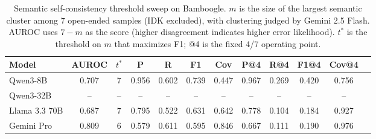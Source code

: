 \begin{table}[t]
\centering
\scriptsize
\setlength\tabcolsep{3pt}
\caption{Semantic self-consistency threshold sweep on Bamboogle. $m$ is the size of the largest semantic cluster among 7 open-ended samples (IDK excluded), with clustering judged by Gemini 2.5 Flash. AUROC uses $7-m$ as the score (higher disagreement indicates higher error likelihood). $t^*$ is the threshold on $m$ that maximizes F1; @4 is the fixed 4/7 operating point.}
\label{tab:bamboogle_self_consistency_semantic_sweep}
\begin{tabular}{lccccccccccc}
\toprule
\textbf{Model} & \textbf{AUROC} & \textbf{$t^*$} & \textbf{P} & \textbf{R} & \textbf{F1} & \textbf{Cov} & \textbf{P@4} & \textbf{R@4} & \textbf{F1@4} & \textbf{Cov@4} \\
\midrule
Qwen3-8B & 0.707 & 7 & 0.956 & 0.602 & 0.739 & 0.447 & 0.967 & 0.269 & 0.420 & 0.756 \\
Qwen3-32B & -- & -- & -- & -- & -- & -- & -- & -- & -- & -- \\
Llama 3.3 70B & 0.687 & 7 & 0.795 & 0.522 & 0.631 & 0.642 & 0.778 & 0.104 & 0.184 & 0.927 \\
Gemini Pro & 0.809 & 6 & 0.579 & 0.611 & 0.595 & 0.846 & 0.667 & 0.111 & 0.190 & 0.976 \\
\bottomrule
\end{tabular}
\end{table}
